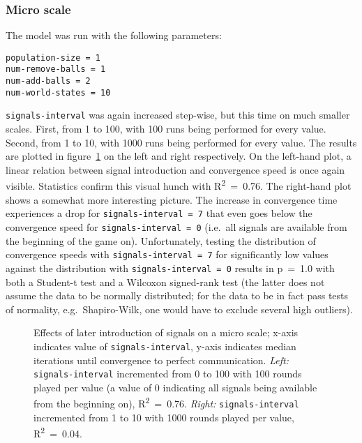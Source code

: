 \documentclass[DIV=calc,BCOR=0mm,pagesize]{scrartcl}
\newcommand{\code}[1]{\texttt{#1}}
\begin{document}
\subsubsection*{Micro scale}
The model was run with the following parameters:
\begin{verbatim}
population-size = 1
num-remove-balls = 1
num-add-balls = 2
num-world-states = 10
\end{verbatim}
\code{signals-interval} was again increased step-wise, but this time on much smaller scales.
First, from 1 to 100, with 100 runs being performed for every value.
Second, from 1 to 10, with 1000 runs being performed for every value.
The results are plotted in figure~\ref{fig:sigmicro} on the left and right respectively.
On the left-hand plot, a linear relation between signal introduction and convergence speed is once again visible.
Statistics confirm this visual hunch with R\textsuperscript{2}~=~0.76.
The right-hand plot shows a somewhat more interesting picture.
The increase in convergence time experiences a drop for \code{signals-interval~=~7} that even goes below the convergence speed for \code{signals-interval~=~0} (i.e.~all signals are available from the beginning of the game on).
Unfortunately, testing the distribution of convergence speeds with \code{signals-interval~=~7} for significantly low values against the distribution with \code{signals-interval~=~0} results in p~=~1.0 with both a Student-t test and a Wilcoxon signed-rank test (the latter does not assume the data to be normally distributed; for the data to be in fact pass tests of normality, e.g.~Shapiro-Wilk, one would have to exclude several high outliers).

\begin{figure}
	\centering
	\caption{Effects of later introduction of signals on a micro scale; x-axis indicates value of \code{signals-interval}, y-axis indicates median iterations until convergence to perfect communication. \emph{Left:} \code{signals-interval} incremented from 0 to 100 with 100 rounds played per value (a value of 0 indicating all signals being available from the beginning on), R\textsuperscript{2}~=~0.76. \emph{Right:} \code{signals-interval} incremented from 1 to 10 with 1000 rounds played per value, R\textsuperscript{2}~=~0.04.}
	\label{fig:sigmicro}
\end{figure}
\end{document}
